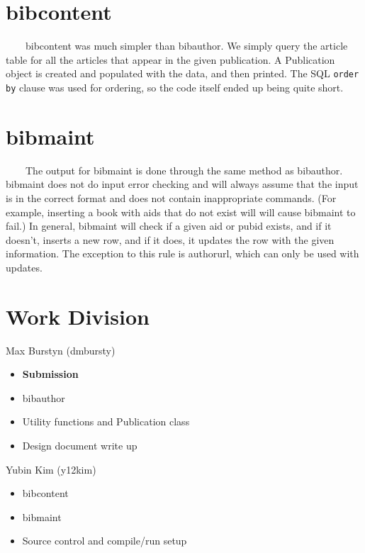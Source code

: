 \documentclass[12pt]{article}
\begin{document}
\section{bibcontent}
\ \ \ \ bibcontent was much simpler than bibauthor.  We simply query the article
table for all the articles that appear in the given publication.  A Publication
object is created and populated with the data, and then printed.  The SQL
\verb!order by! clause was used for ordering, so the code itself ended up being
quite short.

\section{bibmaint}
\ \ \ \ The output for bibmaint is done through the same method as bibauthor.
bibmaint does not do input error checking and will always assume that the
input is in the correct format and does not contain inappropriate commands.
(For example, inserting a book with aids that do not exist will will cause
bibmaint to fail.) In general, bibmaint will check if a given aid or pubid
exists, and if it doesn't, inserts a new row, and if it does, it updates the
row with the given information. The exception to this rule is authorurl, which
can only be used with updates.

\section{Work Division}
Max Burstyn (dmbursty)
\begin{itemize}
\item \textbf{Submission}
\item bibauthor
\item Utility functions and Publication class
\item Design document write up
\end{itemize}

\noindent Yubin Kim (y12kim)
\begin{itemize}
\item bibcontent
\item bibmaint
\item Source control and compile/run setup
\end{itemize}
\end{document}
